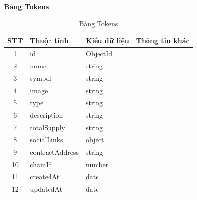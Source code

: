 \hspace{-1cm}\textbf{Bảng Tokens}
\begin{table}[H]
    \centering
    \begin{tabular}{|c|l|l|l|}
        \hline
        STT & Thuộc tính      & Kiểu dữ liệu & Thông tin khác \\
        \hline
        1   & id              & ObjectId     &                \\
        \hline
        2   & name            & string       &                \\
        \hline
        3   & symbol          & string       &                \\
        \hline
        4   & image           & string       &                \\
        \hline
        5   & type            & string       &                \\
        \hline
        6   & description     & string       &                \\
        \hline
        7   & totalSupply     & string       &                \\
        \hline
        8   & socialLinks     & object       &                \\
        \hline
        9   & contractAddress & string       &                \\
        \hline
        10  & chainId         & number       &                \\
        \hline
        11  & createdAt       & date         &                \\
        \hline
        12  & updatedAt       & date         &                \\
        \hline
    \end{tabular}
    \caption{Bảng Tokens}
    \label{tab:tokens}
\end{table}

